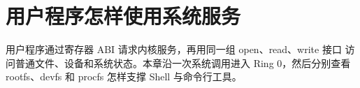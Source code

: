 \chapter{用户程序怎样使用系统服务}

用户程序通过寄存器 ABI 请求内核服务，再用同一组 open、read、write 接口
访问普通文件、设备和系统状态。本章沿一次系统调用进入 Ring 0，然后分别查看
rootfs、devfs 和 procfs 怎样支撑 Shell 与命令行工具。





